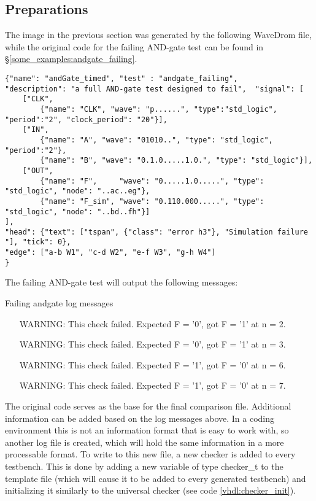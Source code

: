 \subsection{Preparations}
The image in the previous section was generated by the following WaveDrom file, while the original code for the failing AND-gate test can be found in §\ref{some_examples:andgate_failing}.
\begin{lstlisting}[style=json, caption={Source file for the proposed layout in fig \ref{fig:andgate_failing_result}}, label={json:andgate_failing_example}]
{"name": "andGate_timed", "test" : "andgate_failing", 
"description": "a full AND-gate test designed to fail",  "signal": [
	["CLK",
		{"name": "CLK", "wave": "p......", "type":"std_logic", "period":"2", "clock_period": "20"}],
	["IN",
		{"name": "A", "wave": "01010..", "type": "std_logic", "period":"2"},
		{"name": "B", "wave": "0.1.0.....1.0.", "type": "std_logic"}],
	["OUT",
		{"name": "F",     "wave": "0.....1.0.....", "type": "std_logic", "node": "..ac..eg"},
		{"name": "F_sim", "wave": "0.110.000.....", "type": "std_logic", "node": "..bd..fh"}]
], 
"head": {"text": ["tspan", {"class": "error h3"}, "Simulation failure "], "tick": 0}, 
"edge": ["a-b W1", "c-d W2", "e-f W3", "g-h W4"]
}
\end{lstlisting}\noindent
The failing AND-gate test will output the following messages:%
\begin{customenv}
	\caption{Failing andgate log messages}
	\begin{itemize}
		\centering
		\item [WARNING:] This check failed. Expected F = '0', got F = '1' at n = 2.
		\item [WARNING:] This check failed. Expected F = '0', got F = '1' at n = 3.
		\item [WARNING:] This check failed. Expected F = '1', got F = '0' at n = 6.
		\item [WARNING:] This check failed. Expected F = '1', got F = '0' at n = 7.
	\end{itemize}
\end{customenv}
\newpage\noindent
The original code serves as the base for the final comparison file. Additional information can be added based on the log messages above.
\npar
In a coding environment this is not an information format that is easy to work with, so another log file is created, which will hold the same information in a more processable format. To write to this new file, a new checker is added to every testbench. This is done by adding a new variable of type checker\_t to the template file (which will cause it to be added to every generated testbench) and initializing it similarly to the universal checker (see code \ref{vhdl:checker_init}).
